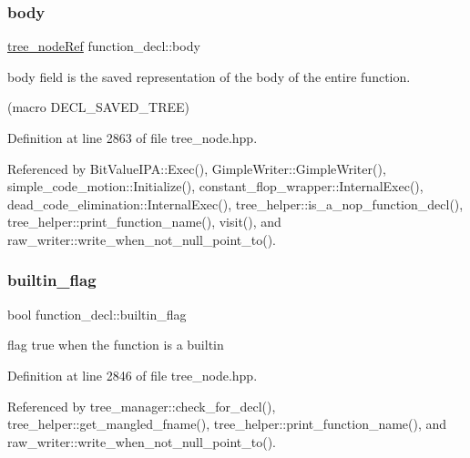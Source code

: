\subsubsection{\texorpdfstring{body}{body}}
{\footnotesize\ttfamily \hyperlink{tree__node_8hpp_a6ee377554d1c4871ad66a337eaa67fd5}{tree\+\_\+node\+Ref} function\+\_\+decl\+::body}



body field is the saved representation of the body of the entire function. 

(macro D\+E\+C\+L\+\_\+\+S\+A\+V\+E\+D\+\_\+\+T\+R\+EE) 

Definition at line 2863 of file tree\+\_\+node.\+hpp.



Referenced by Bit\+Value\+I\+P\+A\+::\+Exec(), Gimple\+Writer\+::\+Gimple\+Writer(), simple\+\_\+code\+\_\+motion\+::\+Initialize(), constant\+\_\+flop\+\_\+wrapper\+::\+Internal\+Exec(), dead\+\_\+code\+\_\+elimination\+::\+Internal\+Exec(), tree\+\_\+helper\+::is\+\_\+a\+\_\+nop\+\_\+function\+\_\+decl(), tree\+\_\+helper\+::print\+\_\+function\+\_\+name(), visit(), and raw\+\_\+writer\+::write\+\_\+when\+\_\+not\+\_\+null\+\_\+point\+\_\+to().

\mbox{\label{structfunction__decl_a275d38da70ab7bafe5ebdd3d65ec4377}} 
\subsubsection{\texorpdfstring{builtin\+\_\+flag}{builtin\_flag}}
{\footnotesize\ttfamily bool function\+\_\+decl\+::builtin\+\_\+flag}



flag true when the function is a builtin 



Definition at line 2846 of file tree\+\_\+node.\+hpp.



Referenced by tree\+\_\+manager\+::check\+\_\+for\+\_\+decl(), tree\+\_\+helper\+::get\+\_\+mangled\+\_\+fname(), tree\+\_\+helper\+::print\+\_\+function\+\_\+name(), and raw\+\_\+writer\+::write\+\_\+when\+\_\+not\+\_\+null\+\_\+point\+\_\+to().

\mbox{\label{structfunction__decl_a60b3a2ebe112f82e850ef7cd999fa29d}} 
